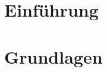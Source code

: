 \documentclass[ngerman, a4paper, 11pt]{report}
\institute{Numerik}
\begin{document}
\makeTUtitle
    
\tableofcontents

\chapter{Einführung}
\label{chapter_1_einfuehrung}




\chapter{Grundlagen}
\label{chapter_2_grundlagen}



\end{document}
